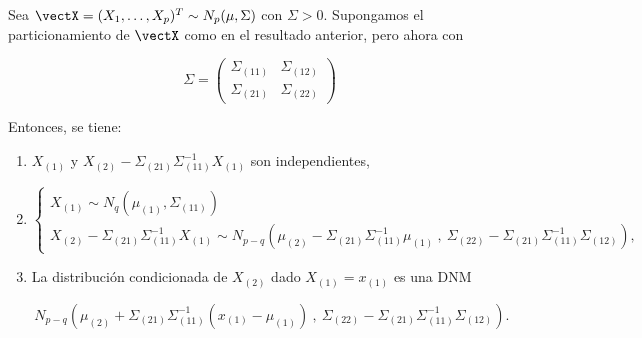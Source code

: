   \begin{nth}
    Sea $\vectX = (X_1, \dots, X_p)^T \sim N_p(\mu,\Sigma)$ con $\Sigma > 0$. Supongamos el particionamiento de $\vectX$ como en el resultado anterior, pero ahora con
    
    \[
\Sigma = \begin{pmatrix}  \Sigma_{(11)} & \Sigma_{(12)} \\ \Sigma_{(21)} & \Sigma_{(22)} \end{pmatrix}
\]

Entonces, se tiene:
\begin{enumerate}
\item $X_{(1)}$ y $X_{(2)} - \Sigma_{(21)} \Sigma_{(11)}^{-1}X_{(1)}$ son independientes, \label{indepitem}
\item \[
  \begin{cases}
    X_{(1)} \sim N_q(\mu_{(1)}, \Sigma_{(11)}) \\
    X_{(2)} - \Sigma_{(21)} \Sigma_{(11)}^{-1}X_{(1)} \sim N_{p-q}\left(\mu_{(2)} - \Sigma_{(21)}\Sigma_{(11)}^{-1}\mu_{(1)} \ , \ \Sigma_{(22)} - \Sigma_{(21)} \Sigma_{(11)}^{-1} \Sigma_{(12)}\right)
  ,\end{cases}
  \]
  
\item La distribución condicionada de $X_{(2)}$ dado $X_{(1)} = x_{(1)}$ es una DNM
  
  \[
    N_{p-q}\left(\mu_{(2)} + \Sigma_{(21)}\Sigma_{(11)}^{-1}(x_{(1)} - \mu_{(1)}) \ , \ \Sigma_{(22)} - \Sigma_{(21)} \Sigma_{(11)}^{-1} \Sigma_{(12)}\right)
  .\]
  
\end{enumerate}
  \end{nth}
